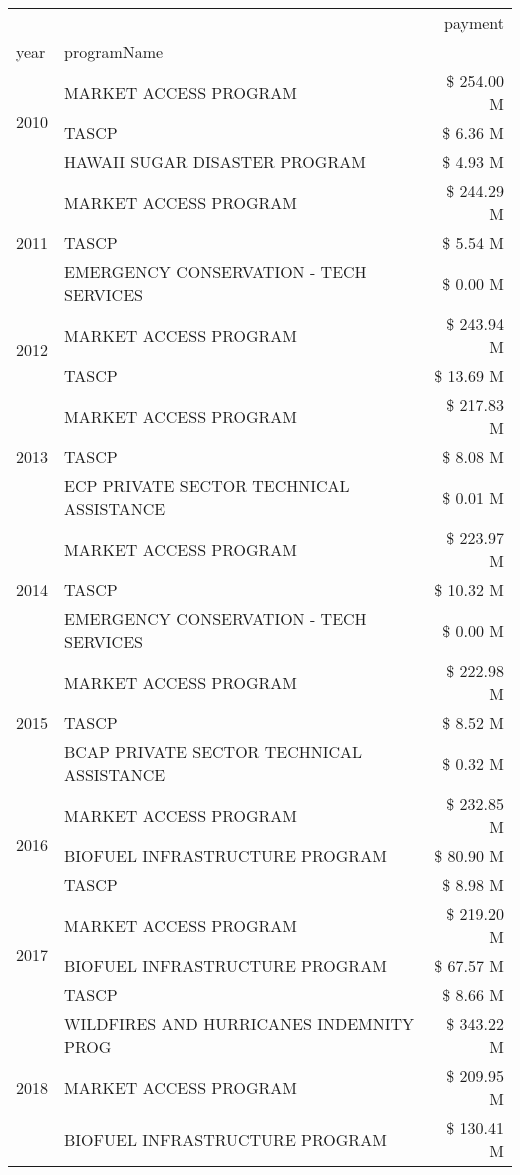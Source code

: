 \begin{tabular}{llr}
\toprule
 &  & payment \\
year & programName &  \\
\midrule
\multirow[t]{3}{*}{2010} & MARKET ACCESS PROGRAM & \$ 254.00 M \\
 & TASCP & \$ 6.36 M \\
 & HAWAII SUGAR DISASTER PROGRAM & \$ 4.93 M \\
\cline{1-3}
\multirow[t]{3}{*}{2011} & MARKET ACCESS PROGRAM & \$ 244.29 M \\
 & TASCP & \$ 5.54 M \\
 & EMERGENCY CONSERVATION - TECH SERVICES & \$ 0.00 M \\
\cline{1-3}
\multirow[t]{2}{*}{2012} & MARKET ACCESS PROGRAM & \$ 243.94 M \\
 & TASCP & \$ 13.69 M \\
\cline{1-3}
\multirow[t]{3}{*}{2013} & MARKET ACCESS PROGRAM & \$ 217.83 M \\
 & TASCP & \$ 8.08 M \\
 & ECP PRIVATE SECTOR TECHNICAL ASSISTANCE & \$ 0.01 M \\
\cline{1-3}
\multirow[t]{3}{*}{2014} & MARKET ACCESS PROGRAM & \$ 223.97 M \\
 & TASCP & \$ 10.32 M \\
 & EMERGENCY CONSERVATION - TECH SERVICES & \$ 0.00 M \\
\cline{1-3}
\multirow[t]{3}{*}{2015} & MARKET ACCESS PROGRAM & \$ 222.98 M \\
 & TASCP & \$ 8.52 M \\
 & BCAP PRIVATE SECTOR TECHNICAL ASSISTANCE & \$ 0.32 M \\
\cline{1-3}
\multirow[t]{3}{*}{2016} & MARKET ACCESS PROGRAM & \$ 232.85 M \\
 & BIOFUEL INFRASTRUCTURE PROGRAM & \$ 80.90 M \\
 & TASCP & \$ 8.98 M \\
\cline{1-3}
\multirow[t]{3}{*}{2017} & MARKET ACCESS PROGRAM & \$ 219.20 M \\
 & BIOFUEL INFRASTRUCTURE PROGRAM & \$ 67.57 M \\
 & TASCP & \$ 8.66 M \\
\cline{1-3}
\multirow[t]{3}{*}{2018} & WILDFIRES AND HURRICANES INDEMNITY PROG & \$ 343.22 M \\
 & MARKET ACCESS PROGRAM & \$ 209.95 M \\
 & BIOFUEL INFRASTRUCTURE PROGRAM & \$ 130.41 M \\

\end{tabular}
